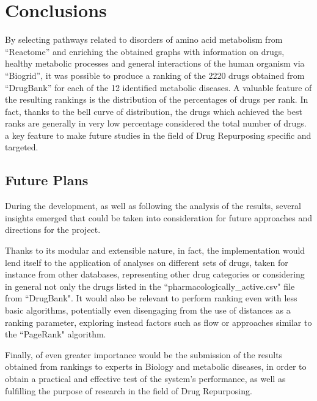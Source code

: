 \chapter{Conclusions}\label{chap:conclusions}

By selecting pathways related to disorders of amino acid metabolism from ``Reactome'' and enriching the obtained graphs with information on drugs, healthy metabolic processes and general interactions of the human organism via ``Biogrid'', it was possible to produce a ranking of the 2220 drugs obtained from ``DrugBank'' for each of the 12 identified metabolic diseases. 
A valuable feature of the resulting rankings is the distribution of the percentages of drugs per rank. In fact, thanks to the bell curve of distribution, the drugs which achieved the best ranks are generally in very low percentage considered the total number of drugs. a key feature to make future studies in the field of Drug Repurposing specific and targeted.

\section{Future Plans}
During the development, as well as following the analysis of the results, several insights emerged that could be taken into consideration for future approaches and directions for the project.

Thanks to its modular and extensible nature, in fact, the implementation would lend itself to the application of analyses on different sets of drugs, taken for instance from other databases, representing other drug categories or considering in general not only the drugs listed in the ``pharmacologically\_active.csv" file from ``DrugBank". It would also be relevant to perform ranking even with less basic algorithms, potentially even disengaging from the use of distances as a ranking parameter, exploring instead factors such as flow or approaches similar to the ``PageRank" algorithm.

Finally, of even greater importance would be the submission of the results obtained from rankings to experts in Biology and metabolic diseases, in order to obtain a practical and effective test of the system's performance, as well as fulfilling the purpose of research in the field of Drug Repurposing.
